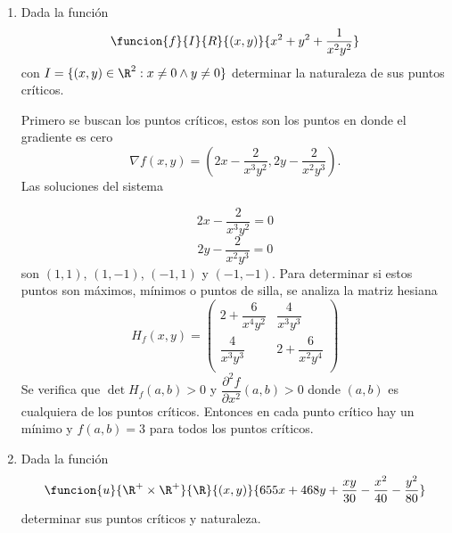 \documentclass[a4,11pt]{aleph-examen}
\begin{document}
\begin{preguntas}
\begin{respuesta}
\begin{respuesta}
\begin{respuesta}
\begin{enumerate}
\item
    Dada la función
    \[
    \funcion{f}{I}{R}{(x,y)}{x^2+y^2+\frac{1}{x^2y^2}}
    \]
    con $I=\lbrace (x,y)\in\R^2:x\neq 0 \land y\neq 0 \rbrace$ determinar la naturaleza de sus puntos críticos.

\begin{respuesta}
    Primero se buscan los puntos críticos, estos son los puntos en donde el gradiente es cero
    \[
    \nabla f(x,y)=\left(2x-\frac{2}{x^3y^2},2y-\frac{2}{x^2y^3}\right).
    \]
    Las soluciones del sistema
    
    \[
    2x-\frac{2}{x^3y^2}=0
    \]
    \[
    2y-\frac{2}{x^2y^3}=0
	\]
    son $(1,1)$, $(1,-1)$, $(-1,1)$ y $(-1,-1)$.
    Para determinar si estos puntos son máximos, mínimos o puntos de silla, se analiza la matriz hesiana
    \[
    H_f(x,y)=\left( {\begin{array}{cc}
   2+\dfrac{6}{x^4y^2} & \dfrac{4}{x^3y^3} \\
   \dfrac{4}{x^3y^3} & 2+\dfrac{6}{x^2y^4} \\
  \end{array} } \right)
    \]
    Se verifica que $\det H_f(a,b)>0$ y $\dfrac{\partial^2f}{\partial x^2 }(a,b)>0$ donde $(a,b)$ es cualquiera de los puntos críticos. Entonces en cada punto crítico hay un mínimo y $f(a,b)=3$ para todos los puntos críticos.
\end{respuesta}

\item
    Dada la función
    \[
     \funcion{u}{\R^+ \times \R^+}{\R}{(x,y)}{655x+468y+\frac{xy}{30}-\frac{x^2}{40}-\frac{y^2}{80}}
    \]
    determinar sus puntos críticos y naturaleza.



\end{enumerate}
\end{respuesta}
\end{respuesta}
\end{respuesta}
\end{preguntas}
\end{document}
